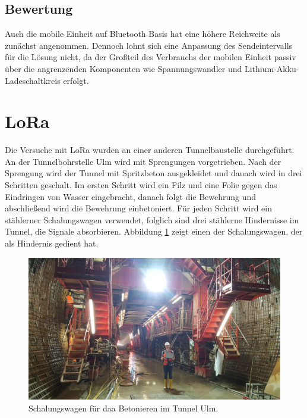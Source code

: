 \subsection{Bewertung}
Auch die mobile Einheit auf Bluetooth Basis hat eine höhere Reichweite als zunächst angenommen. 
Dennoch lohnt sich eine Anpassung des Sendeintervalls für die Lösung nicht, da der Großteil des Verbrauchs der mobilen Einheit passiv über die angrenzenden Komponenten wie Spannungswandler und Lithium-Akku-Ladeschaltkreis erfolgt.





\section{LoRa}
Die Versuche mit LoRa wurden an einer anderen Tunnelbaustelle durchgeführt.
An der Tunnelbohrstelle Ulm wird mit Sprengungen vorgetrieben.
Nach der Sprengung wird der Tunnel mit Spritzbeton ausgekleidet und danach wird in drei Schritten geschalt. 
Im ersten Schritt wird ein Filz und eine Folie gegen das Eindringen von Wasser eingebracht, danach folgt die Bewehrung und abschließend wird die Bewehrung einbetoniert.
Für jeden Schritt wird ein stählerner Schalungswagen verwendet, folglich sind drei stählerne Hindernisse im Tunnel, die Signale absorbieren.
Abbildung \ref{fig:schalungswagen} zeigt einen der Schalungswagen, der als Hindernis gedient hat.

\begin{figure}[h]
  \centering
	\includegraphics[width=\textwidth]{images/schalungswagen.jpg}
  \caption{Schalungswagen für daa Betonieren im Tunnel Ulm.}
  \label{fig:schalungswagen}
\end{figure}

